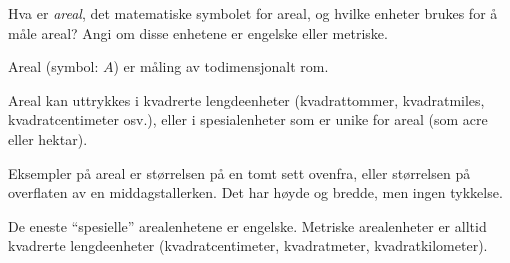 

Hva er {\it areal}, det matematiske symbolet for areal, og hvilke enheter brukes for å måle areal?  Angi om disse enhetene er engelske eller metriske.







Areal (symbol: $A$) er måling av todimensjonalt rom.

\vskip 10pt

Areal kan uttrykkes i kvadrerte lengdeenheter (kvadrattommer, kvadratmiles, kvadratcentimeter osv.), eller i spesialenheter som er unike for areal (som acre eller hektar).







Eksempler på areal er størrelsen på en tomt sett ovenfra, eller størrelsen på overflaten av en middagstallerken.  Det har høyde og bredde, men ingen tykkelse.

De eneste ``spesielle'' arealenhetene er engelske.  Metriske arealenheter er alltid kvadrerte lengdeenheter (kvadratcentimeter, kvadratmeter, kvadratkilometer).


